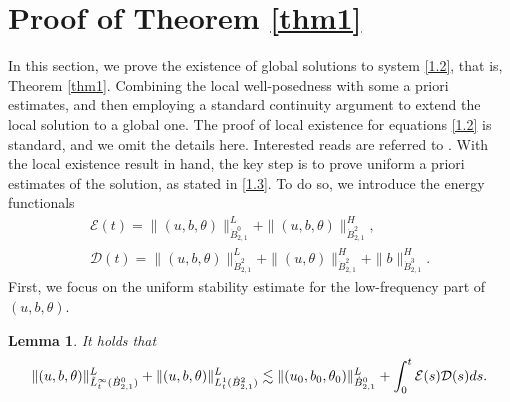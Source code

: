 \documentclass[10pt,a4paper]{amsart}
\numberwithin{equation}{section}
\newtheorem{lemma}[theorem]{Lemma}
\begin{document}
\section{Proof of Theorem \ref{thm1}}

 In this section, we prove the existence of global solutions to system
 \eqref{1.2}, that is, Theorem \ref{thm1}. Combining the local well-posedness with
some a priori estimates, and then employing a standard continuity argument to extend
the local solution to a global one. The proof of local existence for equations
\eqref{1.2} is standard, and we omit the details here. Interested reads are referred
to \cite{MR1855277,MR4496608}. With the local existence result in hand, the key step
is to prove uniform a priori estimates of the solution, as stated in \eqref{1.3}.
To do so, we introduce the energy functionals
 \begin{equation}\label{3.1}
\begin{gathered}
 \mathcal{E}(t)=\|(u,b,\theta)\|^L_{\dot{B}^0_{2,1}}
 +\|(u,b,\theta)\|^H_{\dot{B}^2_{2,1}}, \\
 \mathcal{D}(t)=\|(u,b,\theta)\|^L_{\dot{B}^2_{2,1}}+\|(u,\theta)\|^H_{\dot{B}^2_{2,1}}
 +\|b\|^H_{\dot{B}^3_{2,1}}.
\end{gathered}
\end{equation}
First, we focus on the uniform stability estimate for the low-frequency part of
$(u,b,\theta)$.

\begin{lemma}\label{lem3.1}
It holds that
\begin{equation}\label{3.2}
 \|(u,b,\theta)\|_{\tilde{L}^\infty_t(\dot{B}^0_{2,1})}^L+\|(u,b,\theta)\|_{{L}^1_t(\dot{B}^2_{2,1})}^L\lesssim\|(u_0,b_0,\theta_0)\|_{\dot{B}^0_{2,1}}^L+\int_0^t\mathcal{E}(s)\mathcal{D}(s){\rm d}s.
\end{equation}
\end{lemma}
\end{document}
